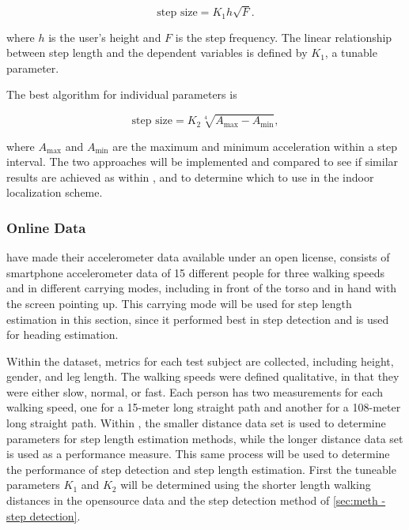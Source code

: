 \begin{equation}
	\label{eq:Tian2016_sle2}
	\text{step size} = K_1 h \sqrt{F}.
\end{equation}


where $h$ is the user's height and $F$ is the step frequency. The linear relationship between step length and the dependent variables is defined by $ K_1 $, a tunable parameter. \par 

The best algorithm for individual parameters is 

\begin{equation}
	\text{step size} =K_2 \sqrt[4]{A_{\max }-A_{\min }},
	\label{eq:weinberg_stepsize2}
\end{equation}

where $A_{\max}$ and $A_{\min}$ are the maximum and minimum acceleration within a step interval. The two approaches will be implemented and compared to see if similar results are achieved as within \cite{Vezocnik2019}, and to determine which to use in the indoor localization scheme.

\subsubsection{Online Data}

\citet{Vezocnik2019} have made their accelerometer data available under an open license, consists of smartphone accelerometer data of 15 different people for three walking speeds and in different carrying modes, including in front of the torso and in hand with the screen pointing up. This carrying mode will be used for step length estimation in this section, since it performed best in step detection and is used for heading estimation. \par 
Within the dataset, metrics for each test subject are collected, including height, gender, and leg length. The walking speeds were defined qualitative, in that they were either slow, normal, or fast. Each person has two measurements for each walking speed, one for a 15-meter long straight path and another for a 108-meter long straight path. Within \cite{Vezocnik2019}, the smaller distance data set is used to determine parameters for step length estimation methods, while the longer distance data set is used as a performance measure. This same process will be used to determine the performance of step detection and step length estimation. First the tuneable parameters $ K_1$ and $ K_2$ will be determined using the shorter length walking distances in the opensource data and the step detection method of \cref{sec:meth - step detection}. \par 

